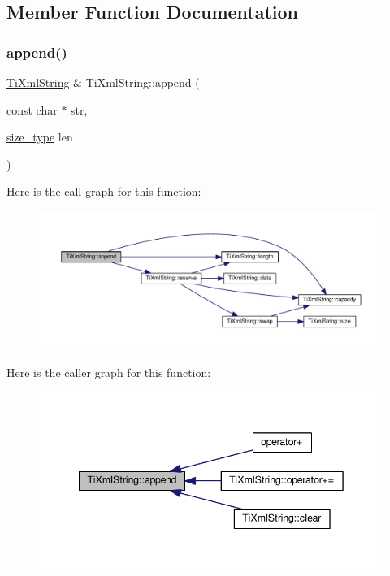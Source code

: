 \subsection{Member Function Documentation}
\mbox{\label{class_ti_xml_string_ad44b21700d2ec24a511367b222b643fb}} 
\subsubsection{\texorpdfstring{append()}{append()}}
{\footnotesize\ttfamily \hyperlink{class_ti_xml_string}{Ti\+Xml\+String} \& Ti\+Xml\+String\+::append (\begin{DoxyParamCaption}\item[{const char $\ast$}]{str,  }\item[{\hyperlink{class_ti_xml_string_abeb2c1893a04c17904f7c06546d0b971}{size\+\_\+type}}]{len }\end{DoxyParamCaption})}

Here is the call graph for this function\+:
\nopagebreak
\begin{figure}[H]
\begin{center}
\leavevmode
\includegraphics[width=350pt]{class_ti_xml_string_ad44b21700d2ec24a511367b222b643fb_cgraph}
\end{center}
\end{figure}
Here is the caller graph for this function\+:
\nopagebreak
\begin{figure}[H]
\begin{center}
\leavevmode
\includegraphics[width=342pt]{class_ti_xml_string_ad44b21700d2ec24a511367b222b643fb_icgraph}
\end{center}
\end{figure}
\mbox{\label{class_ti_xml_string_ac72f3d9149b7812c1e6c59402014d0d5}} 
